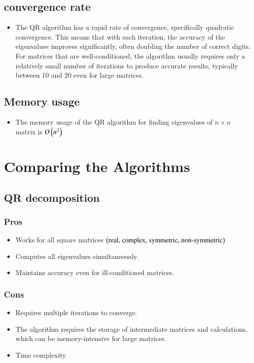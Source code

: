 \documentclass[journal]{IEEEtran}
\begin{document}
\subsection{convergence rate}
\begin{itemize}
    \item The QR algorithm has a rapid rate of convergence, specifically quadratic convergence. This means that with each iteration, the accuracy of the eigenvalues improves significantly, often doubling the number of correct digits. For matrices that are well-conditioned, the algorithm usually requires only a relatively small number of iterations to produce accurate results, typically between 10 and 20 even for large matrices.
\end{itemize}
\subsection{Memory usage}
\begin{itemize}
    \item The memory usage of the QR algorithm for finding eigenvalues of $n \times n$ matrix is $O\left(n^2\right)$
\end{itemize}
\section{Comparing the Algorithms}

\subsection{QR decomposition\\}
\subsubsection{Pros}
\begin{itemize}
    \item Works for all square matrices $\left(\text{real, complex, symmetric, non-symmetric}\right)$
    \item Computes all eigenvalues simultaneously.
    \item Maintains accuracy even for ill-conditioned matrices.
\end{itemize}
\subsubsection{Cons}
\begin{itemize}
    \item Requires multiple iterations to converge.
    \item The algorithm requires the storage of intermediate matrices and calculations, which can be memory-intensive for large matrices.
    \item Time complexity 
\end{itemize}
\end{document}
